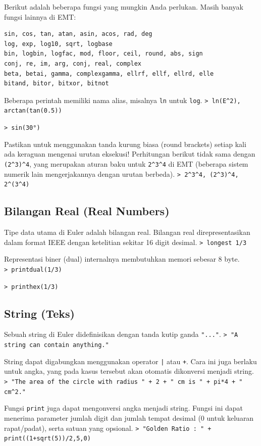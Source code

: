\documentclass[11pt, a4paper]{article}
\newcommand{\emtcmd}[1]{\noindent\texttt{\textcolor{emtcommand}{>}\ #1}\par\smallskip}
\begin{document}
Berikut adalah beberapa fungsi yang mungkin Anda perlukan. Masih banyak fungsi lainnya di EMT:
\begin{verbatim}
sin, cos, tan, atan, asin, acos, rad, deg
log, exp, log10, sqrt, logbase
bin, logbin, logfac, mod, floor, ceil, round, abs, sign
conj, re, im, arg, conj, real, complex
beta, betai, gamma, complexgamma, ellrf, ellf, ellrd, elle
bitand, bitor, bitxor, bitnot
\end{verbatim}

Beberapa perintah memiliki nama alias, misalnya \texttt{ln} untuk \texttt{log}.
\emtcmd{ln(E\^{}2), arctan(tan(0.5))}
\emtcmd{sin(30°)}

Pastikan untuk menggunakan tanda kurung biasa (round brackets) setiap kali ada keraguan mengenai urutan eksekusi! Perhitungan berikut tidak sama dengan \texttt{(2\^{}3)\^{}4}, yang merupakan aturan baku untuk \texttt{2\^{}3\^{}4} di EMT (beberapa sistem numerik lain mengerjakannya dengan urutan berbeda).
\emtcmd{2\^{}3\^{}4, (2\^{}3)\^{}4, 2\^{}(3\^{}4)}

\subsection*{Bilangan Real (Real Numbers)}

Tipe data utama di Euler adalah bilangan real. Bilangan real direpresentasikan dalam format IEEE dengan ketelitian sekitar 16 digit desimal.
\emtcmd{longest 1/3}

Representasi biner (dual) internalnya membutuhkan memori sebesar 8 byte.
\emtcmd{printdual(1/3)}
\emtcmd{printhex(1/3)}

\subsection*{String (Teks)}

Sebuah string di Euler didefinisikan dengan tanda kutip ganda \texttt{"..."}.
\emtcmd{"A string can contain anything."}

String dapat digabungkan menggunakan operator \texttt{|} atau \texttt{+}. Cara ini juga berlaku untuk angka, yang pada kasus tersebut akan otomatis dikonversi menjadi string.
\emtcmd{"The area of the circle with radius " + 2 + " cm is " + pi*4 + " cm\^{}2."}

Fungsi \texttt{print} juga dapat mengonversi angka menjadi string. Fungsi ini dapat menerima parameter jumlah digit dan jumlah tempat desimal (0 untuk keluaran rapat/padat), serta satuan yang opsional.
\emtcmd{"Golden Ratio : " + print((1+sqrt(5))/2,5,0)}
\end{document}
